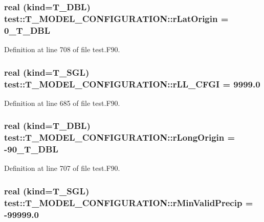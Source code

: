 \hypertarget{typetest_1_1_t___m_o_d_e_l___c_o_n_f_i_g_u_r_a_t_i_o_n_a8643d3b52e0e572fdd21c0ceab9db1ec}{
\subsubsection[{rLatOrigin}]{\setlength{\rightskip}{0pt plus 5cm}real (kind={\bf T\_\-DBL}) {\bf test::T\_\-MODEL\_\-CONFIGURATION::rLatOrigin} = 0\_\-T\_\-DBL}}
\label{typetest_1_1_t___m_o_d_e_l___c_o_n_f_i_g_u_r_a_t_i_o_n_a8643d3b52e0e572fdd21c0ceab9db1ec}


Definition at line 708 of file test.F90.

\hypertarget{typetest_1_1_t___m_o_d_e_l___c_o_n_f_i_g_u_r_a_t_i_o_n_a33b533e838dfee9e39017329921f159c}{
\subsubsection[{rLL\_\-CFGI}]{\setlength{\rightskip}{0pt plus 5cm}real (kind={\bf T\_\-SGL}) {\bf test::T\_\-MODEL\_\-CONFIGURATION::rLL\_\-CFGI} = 9999.0}}
\label{typetest_1_1_t___m_o_d_e_l___c_o_n_f_i_g_u_r_a_t_i_o_n_a33b533e838dfee9e39017329921f159c}


Definition at line 685 of file test.F90.

\hypertarget{typetest_1_1_t___m_o_d_e_l___c_o_n_f_i_g_u_r_a_t_i_o_n_a3165b791bf4761ac4f0a2640ac65b521}{
\subsubsection[{rLongOrigin}]{\setlength{\rightskip}{0pt plus 5cm}real (kind={\bf T\_\-DBL}) {\bf test::T\_\-MODEL\_\-CONFIGURATION::rLongOrigin} = -\/90\_\-T\_\-DBL}}
\label{typetest_1_1_t___m_o_d_e_l___c_o_n_f_i_g_u_r_a_t_i_o_n_a3165b791bf4761ac4f0a2640ac65b521}


Definition at line 707 of file test.F90.

\hypertarget{typetest_1_1_t___m_o_d_e_l___c_o_n_f_i_g_u_r_a_t_i_o_n_a1a8c09cbbcf4059725fdcbda0ace56d9}{
\subsubsection[{rMinValidPrecip}]{\setlength{\rightskip}{0pt plus 5cm}real (kind={\bf T\_\-SGL}) {\bf test::T\_\-MODEL\_\-CONFIGURATION::rMinValidPrecip} = -\/99999.0}}
\label{typetest_1_1_t___m_o_d_e_l___c_o_n_f_i_g_u_r_a_t_i_o_n_a1a8c09cbbcf4059725fdcbda0ace56d9}



